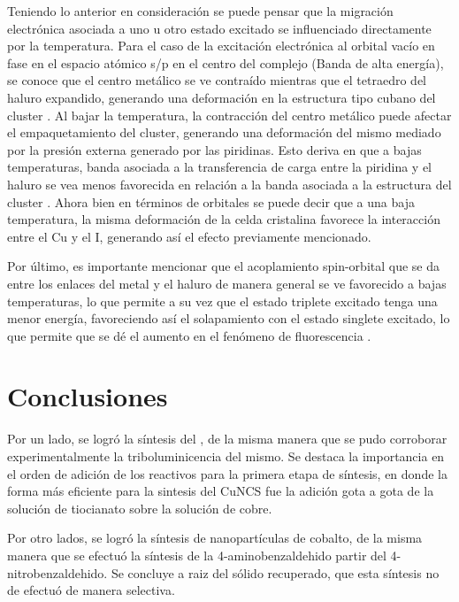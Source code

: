 \documentclass[fleqn,10pt]{SelfArx}
\begin{document}
Teniendo lo anterior en consideración se puede pensar que la migración electrónica asociada a uno u otro estado excitado se influenciado directamente por la temperatura. Para el caso de la excitación electrónica al orbital vacío en fase en el espacio atómico s/p en el centro del complejo (Banda de alta energía), se conoce que el centro metálico se ve contraído mientras que el tetraedro del haluro expandido, generando una deformación en la estructura tipo cubano del cluster \cite{kitagawa_ozawa_toriumi_2010}. Al bajar la temperatura, la contracción del centro metálico puede afectar el empaquetamiento del cluster, generando una deformación del mismo mediado por la presión externa generado por las piridinas. Esto deriva en que a bajas temperaturas, banda asociada a la transferencia de carga entre la piridina y el haluro se vea menos favorecida en relación a la banda asociada a la estructura del cluster \cite{kitagawa_ozawa_toriumi_2010}. Ahora bien en términos de orbitales se puede decir que a una baja temperatura, la misma deformación de la celda cristalina favorece la interacción entre el Cu y el I, generando así el efecto previamente mencionado.

Por último, es importante mencionar que el acoplamiento spin-orbital que se da entre los enlaces del metal y el haluro de manera general se ve favorecido a bajas temperaturas, lo que permite a su vez que el estado triplete excitado tenga una menor energía, favoreciendo así el solapamiento con el estado singlete excitado, lo que permite que se dé el aumento en el fenómeno de fluorescencia \cite{kitagawa_ozawa_toriumi_2010}.

\section{Conclusiones}
Por un lado, se logró la síntesis del , de la misma manera que se pudo corroborar experimentalmente la triboluminicencia del mismo. Se destaca la importancia en el orden de adición de los reactivos para la primera etapa de síntesis, en donde la forma más eficiente para la sintesis del CuNCS fue la adición gota a gota de la solución de tiocianato sobre la solución de cobre.

Por otro lados, se logró la síntesis de nanopartículas de cobalto, de la misma manera que se efectuó la síntesis de la 4-aminobenzaldehido partir del 4-nitrobenzaldehido. Se concluye a raiz del sólido recuperado, que esta síntesis no de efectuó de manera selectiva.
\end{document}
